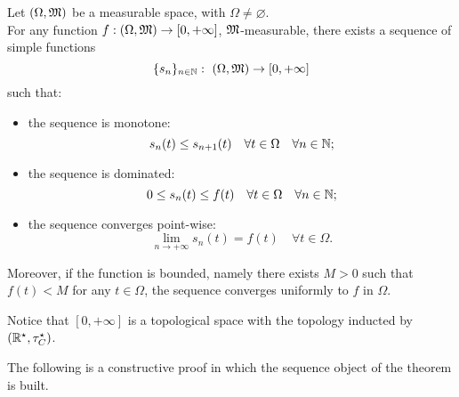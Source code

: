 \begin{theo}
	Let $(\Omega,\mathfrak M)$ be a measurable space, with $\Omega \neq \varnothing$.\\
	For any function $f:(\Omega,\mathfrak M) \to \left[0,+\infty\right]$, $\mathfrak M$-measurable, there exists a sequence of simple functions 
	$$
		\{s_n\}_{n\in \mathbb N}: 
		\ (\Omega,\mathfrak M)\to\left[0,+\infty\right]
	$$
	such that:
	\begin{itemize}
		\item the sequence is monotone: 
			$$
				s_n(t) \leq s_{n+1}(t)
				\quad \forall t\in \Omega 
				\quad \forall n\in\mathbb N
			;
			$$
		\item the sequence is dominated: 
			$$
				0 \leq s_n(t) \leq f(t)
				\quad \forall t \in \Omega 
				\quad \forall n\in\mathbb N
			;
			$$
		\item the sequence converges point-wise: 
			$$
				\lim\limits_{n \to + \infty} s_n(t) = f(t) 
				\quad \forall t\in \Omega
			.
			$$
	\end{itemize}
	Moreover, if the function is bounded, namely there exists $M>0$ such that $f(t) < M$ for any $t \in \Omega$, the sequence converges uniformly to $f$ in $\Omega$.
\end{theo}

Notice that $[0,+\infty]$ is a topological space with the topology inducted by $(\mathbb R^\star, \tau_C^\star)$.

The following is a constructive proof in which the sequence object of the theorem is built.

